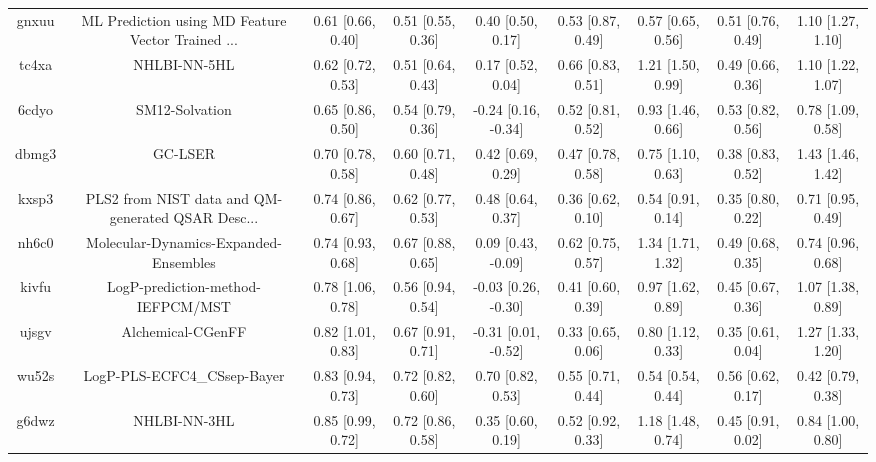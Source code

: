 \documentclass{article}
\begin{document}
\begin{center}
\begin{longtable}{|ccccccccc|}
 gnxuu &  ML Prediction using MD Feature Vector Trained ... &  0.61 [0.66, 0.40] &  0.51 [0.55, 0.36] &     0.40 [0.50, 0.17] &  0.53 [0.87, 0.49] &     0.57 [0.65, 0.56] &     0.51 [0.76, 0.49] &     1.10 [1.27, 1.10] \\
 tc4xa &                                       NHLBI-NN-5HL &  0.62 [0.72, 0.53] &  0.51 [0.64, 0.43] &     0.17 [0.52, 0.04] &  0.66 [0.83, 0.51] &     1.21 [1.50, 0.99] &     0.49 [0.66, 0.36] &     1.10 [1.22, 1.07] \\
 6cdyo &                                     SM12-Solvation &  0.65 [0.86, 0.50] &  0.54 [0.79, 0.36] &   -0.24 [0.16, -0.34] &  0.52 [0.81, 0.52] &     0.93 [1.46, 0.66] &     0.53 [0.82, 0.56] &     0.78 [1.09, 0.58] \\
 dbmg3 &                                            GC-LSER &  0.70 [0.78, 0.58] &  0.60 [0.71, 0.48] &     0.42 [0.69, 0.29] &  0.47 [0.78, 0.58] &     0.75 [1.10, 0.63] &     0.38 [0.83, 0.52] &     1.43 [1.46, 1.42] \\
 kxsp3 &  PLS2 from NIST data and QM-generated QSAR Desc... &  0.74 [0.86, 0.67] &  0.62 [0.77, 0.53] &     0.48 [0.64, 0.37] &  0.36 [0.62, 0.10] &     0.54 [0.91, 0.14] &     0.35 [0.80, 0.22] &     0.71 [0.95, 0.49] \\
 nh6c0 &              Molecular-Dynamics-Expanded-Ensembles &  0.74 [0.93, 0.68] &  0.67 [0.88, 0.65] &    0.09 [0.43, -0.09] &  0.62 [0.75, 0.57] &     1.34 [1.71, 1.32] &     0.49 [0.68, 0.35] &     0.74 [0.96, 0.68] \\
 kivfu &                  LogP-prediction-method-IEFPCM/MST &  0.78 [1.06, 0.78] &  0.56 [0.94, 0.54] &   -0.03 [0.26, -0.30] &  0.41 [0.60, 0.39] &     0.97 [1.62, 0.89] &     0.45 [0.67, 0.36] &     1.07 [1.38, 0.89] \\
 ujsgv &                                  Alchemical-CGenFF &  0.82 [1.01, 0.83] &  0.67 [0.91, 0.71] &   -0.31 [0.01, -0.52] &  0.33 [0.65, 0.06] &     0.80 [1.12, 0.33] &     0.35 [0.61, 0.04] &     1.27 [1.33, 1.20] \\
 wu52s &                        LogP-PLS-ECFC4\_CSsep-Bayer &  0.83 [0.94, 0.73] &  0.72 [0.82, 0.60] &     0.70 [0.82, 0.53] &  0.55 [0.71, 0.44] &     0.54 [0.54, 0.44] &     0.56 [0.62, 0.17] &     0.42 [0.79, 0.38] \\
 g6dwz &                                       NHLBI-NN-3HL &  0.85 [0.99, 0.72] &  0.72 [0.86, 0.58] &     0.35 [0.60, 0.19] &  0.52 [0.92, 0.33] &     1.18 [1.48, 0.74] &     0.45 [0.91, 0.02] &     0.84 [1.00, 0.80] \\

\end{longtable}
\end{center}
\end{document}
